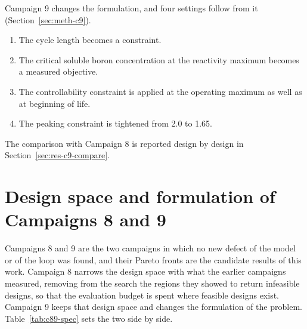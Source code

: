 Campaign 9 changes the formulation, and four settings follow from it
(Section~\ref{sec:meth-c9}).

\begin{enumerate}
  \item The cycle length becomes a constraint.

  \item The critical soluble boron concentration at the reactivity
        maximum becomes a measured objective.

  \item The controllability constraint is applied at the operating maximum
        as well as at beginning of life.

  \item The peaking constraint is tightened from 2.0 to 1.65.
\end{enumerate}

The comparison with Campaign 8 is reported design by design in
Section~\ref{sec:res-c9-compare}.

\section{Design space and formulation of Campaigns 8 and 9}
\label{sec:meth-c8-space}

Campaigns 8 and 9 are the two campaigns in which no new defect of the
model or of the loop was found, and their Pareto fronts are the
candidate results of this work. Campaign 8 narrows the design space
with what the earlier campaigns measured, removing from the search the
regions they showed to return infeasible designs, so that the
evaluation budget is spent where feasible designs exist. Campaign 9
keeps that design space and changes the formulation of the problem.
Table~\ref{tab:c89-spec} sets the two side by side.

